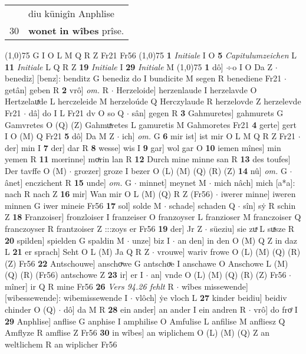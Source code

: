 \documentclass[8pt,a4paper,notitlepage]{article}
\begin{document}
\begin{table}[ht]
\begin{minipage}[t]{0.5\linewidth}
\begin{tabular}{rl}
 & diu künigîn Anphlise\\ 
30 & \textbf{wonet} \textbf{in wîbes} prîse.\\ 
\end{tabular}
\scriptsize
\line(1,0){75} \newline
G I O L M Q R Z Fr21 Fr56 \newline
\line(1,0){75} \newline
\textbf{1} \textit{Initiale} I O  \textbf{5} \textit{Capitulumzeichen} L  \textbf{11} \textit{Initiale} L Q R Z  \textbf{19} \textit{Initiale} I  \textbf{29} \textit{Initiale} M  \newline
\line(1,0){75} \newline
\textbf{1} dô] ÷o I O Da Z  $\cdot$ benediz] [benz]: benditz G benediz do I bundicite M segen R benediene Fr21  $\cdot$ getân] geben R \textbf{2} vrô] \textit{om.} R  $\cdot$ Herzeloide] herzenlaude I herzelavde O Hertzelauͯde L herczeleide M herzeloúde Q Herczylaude R herzelovde Z herzelevde Fr21  $\cdot$ dâ] do I L Fr21 dv O so Q  $\cdot$ sân] gegen R \textbf{3} Gahmuretes] gahmurets G Gamvretes O (Q) (Z) Gahmuͯretes L gamuretis M Gahmoretes Fr21 \textbf{4} gerte] gert I O (M) Q Fr21 \textbf{5} dô] Da M Z  $\cdot$ ich] \textit{om.} G \textbf{6} mir ist] ist mir O L M Q R Z Fr21  $\cdot$ der] min I \textbf{7} der] dar R \textbf{8} wesse] wis I \textbf{9} gar] wol gar O \textbf{10} iemen mînes] min yemen R \textbf{11} mœrinne] moͯrin lan R \textbf{12} Durch mine minne san R \textbf{13} des toufes] Der tavffe O (M)  $\cdot$ grœzer] groze I bezer O (L) (M) (Q) (R) (Z) \textbf{14} nû] \textit{om.} G  $\cdot$ ânet] enczichent R \textbf{15} unde] \textit{om.} G  $\cdot$ minnet] meynet M  $\cdot$ mich nâch] mich [a*a]: nach R nach Z \textbf{16} mir] Wan mir O L (M) (Q) R Z (Fr56)  $\cdot$ iwerer minne] iweren minnen G iwer mineie Fr56 \textbf{17} sol] solde M  $\cdot$ schade] schaden Q  $\cdot$ sîn] sẏ R schin Z \textbf{18} Franzoiser] fronzloiser I franzeiser O franzoyser L franzioser M franczoiser Q franczoyser R frantzoiser Z :::zoys er Fr56 \textbf{19} der] Jr Z  $\cdot$ süeziu] sie zuͯ L suͯsze R \textbf{20} spilden] spielden G spaldin M  $\cdot$ unze] biz I  $\cdot$ an den] in den O (M) Q Z in daz L \textbf{21} er sprach] Seht O L (M) Ja Q R Z  $\cdot$ vrouwe] wariv frowe O (L) (M) (Q) (R) (Z) Fr56 \textbf{22} Antschouwe] anschoͮwe G antschoͮe I anschawe O Anschowe L (M) (Q) (R) (Fr56) antschowe Z \textbf{23} ir] er I  $\cdot$ an] vnde O (L) (M) (Q) (R) (Z) Fr56  $\cdot$ mîner] ir Q R mine Fr56 \textbf{26} \textit{Vers 94.26 fehlt} R   $\cdot$ wîbes missewende] [wibessewende]: wibemissewende I  $\cdot$ vlôch] ẏe vloch L \textbf{27} kinder beidiu] beidiv chinder O (Q)  $\cdot$ dô] da M R \textbf{28} ein ander] an ander I ein andren R  $\cdot$ vrô] do froͤ I \textbf{29} Anphlise] anflise G anphise I amphilise O Amfulise L anfilise M anfliesz Q Amflyze R amflise Z Fr56 \textbf{30} in wîbes] an wiplichem O (L) (M) (Q) Z an weltlichem R an wiplicher Fr56 \newline

\end{minipage}
\end{table}
\end{document}
